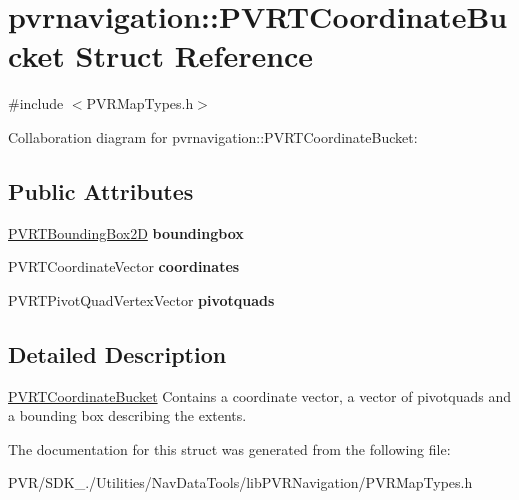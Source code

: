 \hypertarget{structpvrnavigation_1_1_p_v_r_t_coordinate_bucket}{\section{pvrnavigation\+:\+:P\+V\+R\+T\+Coordinate\+Bucket Struct Reference}
\label{structpvrnavigation_1_1_p_v_r_t_coordinate_bucket}
}


{\ttfamily \#include $<$P\+V\+R\+Map\+Types.\+h$>$}



Collaboration diagram for pvrnavigation\+:\+:P\+V\+R\+T\+Coordinate\+Bucket\+:
\subsection*{Public Attributes}
\begin{DoxyCompactItemize}
\item 
\hypertarget{structpvrnavigation_1_1_p_v_r_t_coordinate_bucket_aca0105025765fb7bfedf82ca744321b4}{\hyperlink{structpvrnavigation_1_1_p_v_r_t_bounding_box2_d}{P\+V\+R\+T\+Bounding\+Box2\+D} {\bfseries boundingbox}}\label{structpvrnavigation_1_1_p_v_r_t_coordinate_bucket_aca0105025765fb7bfedf82ca744321b4}

\item 
\hypertarget{structpvrnavigation_1_1_p_v_r_t_coordinate_bucket_aedc28fbfbe3505b24442e8d310edfbb7}{P\+V\+R\+T\+Coordinate\+Vector {\bfseries coordinates}}\label{structpvrnavigation_1_1_p_v_r_t_coordinate_bucket_aedc28fbfbe3505b24442e8d310edfbb7}

\item 
\hypertarget{structpvrnavigation_1_1_p_v_r_t_coordinate_bucket_a1cf157d0985c4df54613f67ab1500278}{P\+V\+R\+T\+Pivot\+Quad\+Vertex\+Vector {\bfseries pivotquads}}\label{structpvrnavigation_1_1_p_v_r_t_coordinate_bucket_a1cf157d0985c4df54613f67ab1500278}

\end{DoxyCompactItemize}


\subsection{Detailed Description}


  \hyperlink{structpvrnavigation_1_1_p_v_r_t_coordinate_bucket}{P\+V\+R\+T\+Coordinate\+Bucket}  Contains a coordinate vector, a vector of pivotquads and a bounding box describing the extents. 

The documentation for this struct was generated from the following file\+:\begin{DoxyCompactItemize}
\item 
P\+V\+R/\+S\+D\+K\+\_./\+Utilities/\+Nav\+Data\+Tools/lib\+P\+V\+R\+Navigation/P\+V\+R\+Map\+Types.\+h\end{DoxyCompactItemize}
